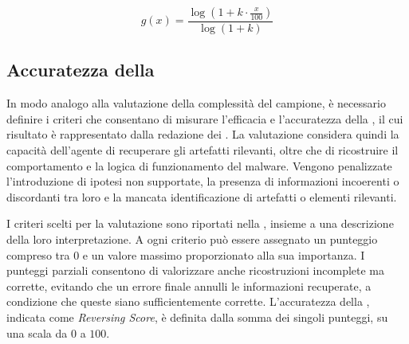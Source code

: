 \begin{equation*}
    g(x) = \frac{\log (1+k \cdot \frac{x}{100})}{\log(1+k)}
    \label{eq:logarithmic_transformation}
\end{equation*}

\subsection{Accuratezza della \reversing{}} %

In modo analogo alla valutazione della complessità del campione, è necessario definire i criteri che consentano di misurare l'efficacia e l'accuratezza della \reversing{}, il cui risultato è rappresentato dalla redazione dei \report{}. La valutazione considera quindi la capacità dell'agente di recuperare gli artefatti rilevanti, oltre che di ricostruire il comportamento e la logica di funzionamento del malware. Vengono penalizzate l'introduzione di ipotesi non supportate, la presenza di informazioni incoerenti o discordanti tra loro e la mancata identificazione di artefatti o elementi rilevanti.


I criteri scelti per la valutazione sono riportati nella , insieme a una descrizione della loro interpretazione. A ogni criterio può essere assegnato un punteggio compreso tra $0$ e un valore massimo proporzionato alla sua importanza. I punteggi parziali consentono di valorizzare anche ricostruzioni incomplete ma corrette, evitando che un errore finale annulli le informazioni recuperate, a condizione che queste siano sufficientemente corrette. L'accuratezza della \reversing{}, indicata come \emph{Reversing Score}, è definita dalla somma dei singoli punteggi, su una scala da $0$ a $100$.



\begin{table}[t]
    \centering
    \caption[Criteri di valutazione della \reversing{}]{Criteri di valutazione della \reversing{}.}
    \label{tab:reversing_criteria}
\end{table}

